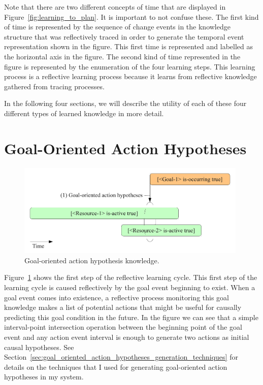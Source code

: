 Note that there are two different concepts of time that are displayed
in Figure~\ref{fig:learning_to_plan}.  It is important to not confuse
these.  The first kind of time is represented by the sequence of
change events in the knowledge structure that was reflectively traced
in order to generate the temporal event representation shown in the
figure.  This first time is represented and labelled as the horizontal
axis in the figure.  The second kind of time represented in the figure
is represented by the enumeration of the four learning steps.  This
learning process is a reflective learning process because it learns
from reflective knowledge gathered from tracing processes.

In the following four sections, we will describe the utility of each
of these four different types of learned knowledge in more detail.

\section{Goal-Oriented Action Hypotheses}
\label{sec:goal_oriented_action_hypotheses}

\begin{figure}[bth]
  \center
  \includegraphics[width=11cm]{gfx/learning_to_plan-1-goal_oriented_action_hypotheses}
  \caption[Goal-oriented action hypothesis knowledge]{Goal-oriented action hypothesis knowledge.}
  \label{fig:goal_oriented_action_hypotheses}
\end{figure}

Figure~\ref{fig:goal_oriented_action_hypotheses} shows the first step
of the reflective learning cycle.  This first step of the learning
cycle is caused reflectively by the goal event beginning to exist.
When a goal event comes into existence, a reflective process
monitoring this goal knowledge makes a list of potential actions that
might be useful for causally predicting this goal condition in the
future.  In the figure we can see that a simple interval-point
intersection operation between the beginning point of the goal event
and any action event interval is enough to generate two actions as
initial causal hypotheses.  See
Section~\ref{sec:goal_oriented_action_hypotheses_generation_techniques}
for details on the techniques that I used for generating goal-oriented
action hypotheses in my system.


